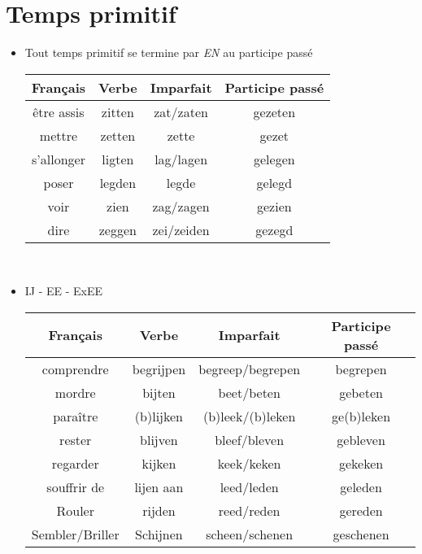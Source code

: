 \documentclass[a4paper]{article}
\begin{document}
\section{Temps primitif}
\begin{itemize}[label=\textbullet, font=\Large]
  \item Tout temps primitif se termine par \emph{EN} au participe passé
  \begin{center}
    \begin{tabular}{|c|c|c|c|}
      \hline
      \textbf{Français} & \textbf{Verbe} & \textbf{Imparfait} & \textbf{Participe passé}\\
      \hline
      être assis & zitten & zat/zaten & gezeten\\
      \hline
      mettre & zetten & zette & gezet\\
      \hline
      s'allonger & ligten & lag/lagen & gelegen\\
      \hline
      poser & legden & legde & gelegd\\
      \hline
      voir & zien & zag/zagen & gezien\\
      \hline
      dire & zeggen & zei/zeiden & gezegd\\
      \hline
    \end{tabular}\\
  \end{center}
  \item IJ - EE - ExEE
  \begin{center}
    \begin{tabular}{|c|c|c|c|}
      \hline
      \textbf{Français} & \textbf{Verbe} & \textbf{Imparfait} & \textbf{Participe passé}\\
      \hline
      comprendre & begrijpen & begreep/begrepen & begrepen\\
      \hline
      mordre & bijten & beet/beten & gebeten\\
      \hline
      paraître & (b)lijken & (b)leek/(b)leken & ge(b)leken\\
      \hline
      rester & blijven & bleef/bleven & gebleven\\
      \hline
      regarder & kijken & keek/keken & gekeken\\
      \hline
      souffrir de & lijen aan & leed/leden & geleden\\
      \hline
      Rouler & rijden & reed/reden & gereden\\
      \hline
      Sembler/Briller & Schijnen & scheen/schenen & geschenen\\

\end{tabular}
\end{center}
\end{itemize}
\end{document}
